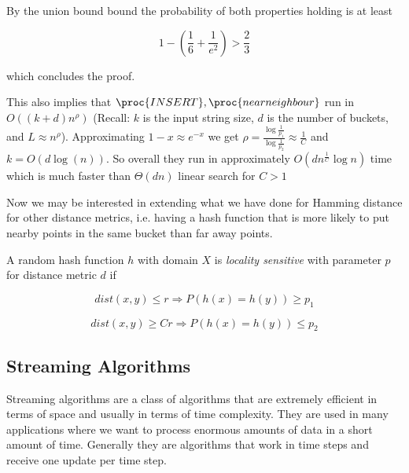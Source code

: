 \documentclass[../notes.tex]{subfiles}
\begin{document}
By the union bound bound the probability of both properties holding is at least


\begin{equation}
    1 - (\frac{1}{6} + \frac{1}{e^2}) > \frac{2}{3}
\end{equation}

which concludes the proof.


This also implies that $ \proc{INSERT}, \proc{nearneighbour} $ run in $ O((k+d)n^{\rho}) $ (Recall: $ k $ is the input string size, $ d $ is the number of buckets, and $ L \approx n^\rho$).
Approximating $ 1 -x \approx e^{-x} $ we get $ \rho = \frac{\log \frac{1}{p_1}}{\log \frac{1}{p_2}} \approx \frac{1}{C} $ and $ k = O(d\log(n)) $. 
So overall they run in approximately $ O(dn^{\frac{1}{C}} \log n) $ time which is much faster than $ \Theta(dn) $ linear search for $ C > 1 $




Now we may be interested in extending what we have done for Hamming distance for other distance metrics, i.e. having a hash function that is more likely to put nearby points in the same bucket than far away points.



\begin{definition}
    A random hash function $ h $ with domain $ X $ is \textit{locality sensitive} with parameter $ p $ for distance metric $ d $ if

    \begin{equation}
        dist(x, y) \le  r \Rightarrow P(h(x) = h(y)) \ge  p_1
    \end{equation}

    \begin{equation}
        dist(x, y) \ge   Cr \Rightarrow P(h(x) = h(y)) \le  p_2
    \end{equation}
    


\end{definition}



\subsection{Streaming Algorithms}

Streaming algorithms are a class of algorithms that are extremely efficient in terms of space and usually in terms of time complexity.
They are used in many applications where we want to process enormous amounts of data in a short amount of time.
Generally they are algorithms that work in time steps and receive one update per time step.
\end{document}
